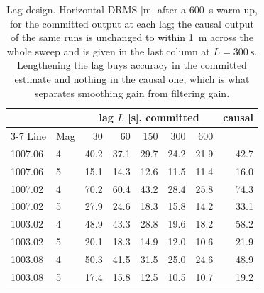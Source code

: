 \begin{table}[t]
\caption{Lag design. Horizontal DRMS [m] after a \SI{600}{\second} warm-up, for
the committed output at each lag; the causal output of the same runs is
unchanged to within \SI{1}{\meter} across the whole sweep and is given in the
last column at $L=\SI{300}{\second}$. Lengthening the lag buys accuracy in the
committed estimate and nothing in the causal one, which is what separates
smoothing gain from filtering gain.}
\label{tab:lag}
\centering
\setlength{\tabcolsep}{4pt}
\begin{tabular}{ll rrrrr r}
\toprule
 & & \multicolumn{5}{c}{lag $L$ [s], committed} & causal \\
\cmidrule(lr){3-7}
Line & Mag & 30 & 60 & 150 & 300 & 600 & \\
\midrule
1007.06 & 4 & 40.2 & 37.1 & 29.7 & 24.2 & 21.9 & 42.7 \\
1007.06 & 5 & 15.1 & 14.3 & 12.6 & 11.5 & 11.4 & 16.0 \\
1007.02 & 4 & 70.2 & 60.4 & 43.2 & 28.4 & 25.8 & 74.3 \\
1007.02 & 5 & 27.9 & 24.6 & 18.3 & 15.8 & 14.2 & 33.1 \\
1003.02 & 4 & 48.9 & 43.3 & 28.8 & 19.6 & 18.2 & 58.2 \\
1003.02 & 5 & 20.1 & 18.3 & 14.9 & 12.0 & 10.6 & 21.9 \\
1003.08 & 4 & 50.3 & 41.5 & 31.5 & 25.0 & 24.6 & 48.9 \\
1003.08 & 5 & 17.4 & 15.8 & 12.5 & 10.5 & 10.7 & 19.2 \\
\bottomrule
\end{tabular}
\end{table}

